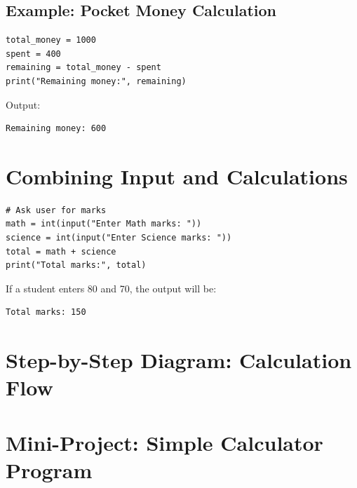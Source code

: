 \subsection{Example: Pocket Money Calculation}

\begin{verbatim}
total_money = 1000
spent = 400
remaining = total_money - spent
print("Remaining money:", remaining)
\end{verbatim}

Output:

\begin{verbatim}
Remaining money: 600
\end{verbatim}

\section{Combining Input and Calculations}

\begin{verbatim}
# Ask user for marks
math = int(input("Enter Math marks: "))
science = int(input("Enter Science marks: "))
total = math + science
print("Total marks:", total)
\end{verbatim}

If a student enters 80 and 70, the output will be:

\begin{verbatim}
Total marks: 150
\end{verbatim}

\section{Step-by-Step Diagram: Calculation Flow}

\begin{center}
\end{center}

\section{Mini-Project: Simple Calculator Program}

